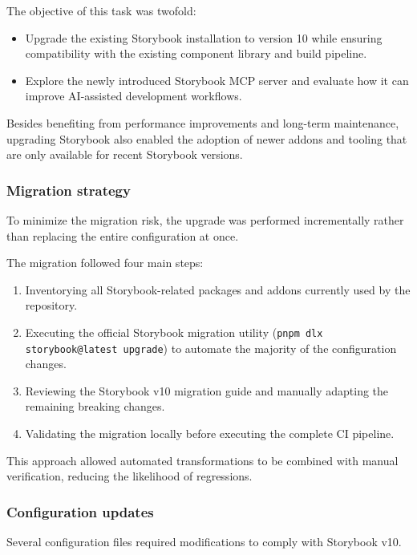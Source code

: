 The objective of this task was twofold:

\begin{itemize}
    \item Upgrade the existing Storybook installation to version 10 while ensuring compatibility with the existing component library and build pipeline.
    \item Explore the newly introduced Storybook \ac{MCP} server and evaluate how it can improve AI-assisted development workflows.
\end{itemize}

Besides benefiting from performance improvements and long-term maintenance, upgrading Storybook also enabled the adoption of newer addons and tooling that are only available for recent Storybook versions.

\subsubsection{Migration strategy}

To minimize the migration risk, the upgrade was performed incrementally rather than replacing the entire configuration at once.

The migration followed four main steps:

\begin{enumerate}
    \item Inventorying all Storybook-related packages and addons currently used by the repository.
    \item Executing the official Storybook migration utility (\lstinline|pnpm dlx storybook@latest upgrade|) to automate the majority of the configuration changes.
    \item Reviewing the Storybook v10 migration guide and manually adapting the remaining breaking changes.
    \item Validating the migration locally before executing the complete CI pipeline.
\end{enumerate}

This approach allowed automated transformations to be combined with manual verification, reducing the likelihood of regressions.

\subsubsection{Configuration updates}

Several configuration files required modifications to comply with Storybook v10.

